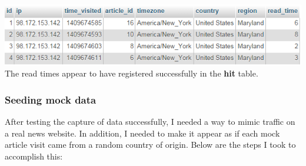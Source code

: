 \documentclass[12pt]{article}
\begin{document}
\noindent\includegraphics[scale=1]{img/results_hits} \\
\noindent The read times appear to have registered successfully in the \textbf{hit} table. \\

\subsubsection{Seeding mock data}
After testing the capture of data successfully, I needed a way to mimic traffic on a real news website. In addition, I needed to make it appear as if each mock article visit came from a random country of origin. Below are the steps I took to accomplish this:
\end{document}
